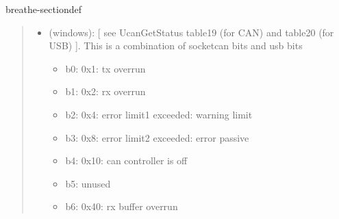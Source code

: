 \documentclass[a4paper,10pt,english]{sphinxmanual}
\begin{document}
\begin{fulllineitems}
\begin{sphinxuseclass}{breathe-sectiondef}
\begin{fulllineitems}
\begin{quote}
\begin{description}
\begin{itemize}
\begin{itemize}
\item {} 
\sphinxAtStartPar
\#define PCAN\_ERROR\_ILLPARAMVAL 0x08000U // Invalid parameter value

\item {} 
\sphinxAtStartPar
\#define PCAN\_ERROR\_UNKNOWN 0x10000U // Unknown error

\item {} 
\sphinxAtStartPar
\#define PCAN\_ERROR\_ILLDATA 0x20000U // Invalid data, function, or action

\item {} 
\sphinxAtStartPar
\#define PCAN\_ERROR\_CAUTION 0x2000000U // An operation was successfully carried out, however, irregularities were registered

\item {} 
\sphinxAtStartPar
\#define PCAN\_ERROR\_INITIALIZE 0x4000000U // Channel is not initialized {[}Value was changed from 0x40000 to 0x4000000{]}

\item {} 
\sphinxAtStartPar
\#define PCAN\_ERROR\_ILLOPERATION 0x8000000U // Invalid operation {[}Value was changed from 0x80000 to 0x8000000{]}

\end{itemize}


\item {} 
\sphinxAtStartPar
{} \textendash{} (windows): {[} see UcanGetStatus table19 (for CAN) and table20 (for USB) {]}. This is a combination of socketcan bits and usb bits\begin{itemize}
\item {} 
\sphinxAtStartPar
b0: 0x1: tx overrun

\item {} 
\sphinxAtStartPar
b1: 0x2: rx overrun

\item {} 
\sphinxAtStartPar
b2: 0x4: error limit1 exceeded: warning limit

\item {} 
\sphinxAtStartPar
b3: 0x8: error limit2 exceeded: error passive

\item {} 
\sphinxAtStartPar
b4: 0x10: can controller is off

\item {} 
\sphinxAtStartPar
b5: unused

\item {} 
\sphinxAtStartPar
b6: 0x40: rx buffer overrun


\end{itemize}
\end{itemize}
\end{description}
\end{quote}
\end{fulllineitems}
\end{sphinxuseclass}
\end{fulllineitems}
\end{document}
